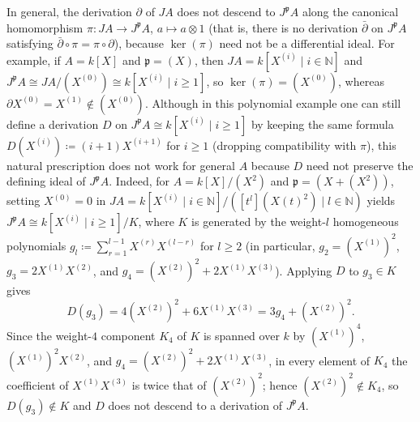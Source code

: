 \documentclass[a4paper, 12pt, reqno]{amsart}
\theoremstyle{remark}
\begin{document}
In general, the derivation $\partial$ of $J A$ does not descend to $J^\mathfrak{p} A$ along the canonical homomorphism $\pi \colon J A \to J^\mathfrak{p} A$, $a \mapsto a \otimes 1$
(that is, there is no derivation $\bar{\partial}$ on $J^\mathfrak{p} A$ satisfying $\bar{\partial} \circ \pi = \pi \circ \partial$),
because $\ker(\pi)$ need not be a differential ideal.
For example, if $A = k[X]$ and $\mathfrak{p} = (X)$,
then $J A = k[X^{(i)} \mid i \in \mathbb{N}]$ and $J^\mathfrak{p} A \cong J A / (X^{(0)}) \cong k[X^{(i)} \mid i \ge 1]$,
so $\ker(\pi) = (X^{(0)})$, whereas $\partial X^{(0)} = X^{(1)} \notin (X^{(0)})$.
Although in this polynomial example one can still define a derivation $D$ on $J^\mathfrak{p} A \cong k[X^{(i)} \mid i \ge 1]$ by keeping the same formula $D(X^{(i)}) \coloneq (i + 1)X^{(i + 1)}$ for $i \ge 1$ (dropping compatibility with $\pi$),
this natural prescription does not work for general $A$ because $D$ need not preserve the defining ideal of $J^\mathfrak{p} A$.
Indeed, for $A = k[X] / (X^2)$ and $\mathfrak{p} = (X + (X^2))$,
setting $X^{(0)} = 0$ in $J A = k[X^{(i)} \mid i \in \mathbb{N}] / ([t^l](X(t)^2) \mid l \in \mathbb{N})$ yields $J^\mathfrak{p} A \cong k[X^{(i)} \mid i \ge 1] / K$,
where $K$ is generated by the weight-$l$ homogeneous polynomials $g_l \coloneq \sum_{r = 1}^{l - 1} X^{(r)}X^{(l - r)}$ for $l \ge 2$
(in particular, $g_2 = (X^{(1)})^2$, $g_3 = 2X^{(1)}X^{(2)}$, and $g_4 = (X^{(2)})^2 + 2X^{(1)}X^{(3)}$).
Applying $D$ to $g_3 \in K$ gives
\begin{equation*}
  D(g_3) = 4(X^{(2)})^2 + 6X^{(1)}X^{(3)} = 3g_4 + (X^{(2)})^2.
\end{equation*}
Since the weight-$4$ component $K_4$ of $K$ is spanned over $k$ by $(X^{(1)})^4$, $(X^{(1)})^2X^{(2)}$, and $g_4 = (X^{(2)})^2 + 2X^{(1)}X^{(3)}$,
in every element of $K_4$ the coefficient of $X^{(1)}X^{(3)}$ is twice that of $(X^{(2)})^2$;
hence $(X^{(2)})^2 \notin K_4$, so $D(g_3) \notin K$ and $D$ does not descend to a derivation of $J^\mathfrak{p} A$.
\end{document}
